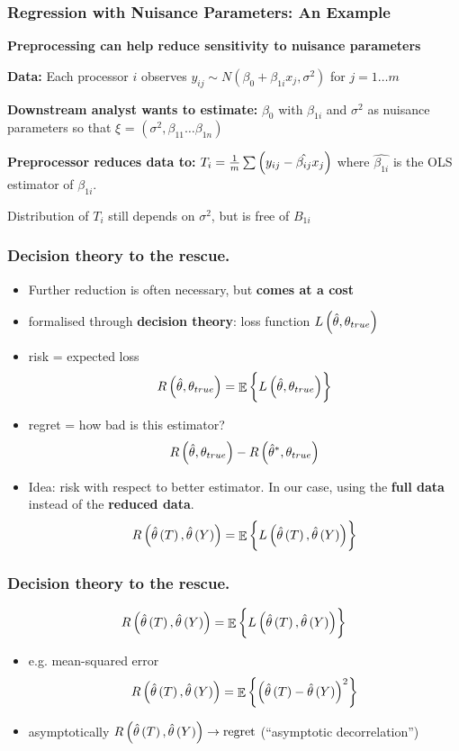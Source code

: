 \documentclass[10pt, compress]{beamer}
\DeclareMathOperator{\E}{\mathbb{E}}
\newcommand{\that}{\hat{\theta}}
\begin{document}
\begin{frame}[fragile]

    \frametitle{Regression with Nuisance Parameters: An Example}
    
    \textbf{Preprocessing can help reduce sensitivity to nuisance parameters}
    
    \vspace*{5mm}
    
    \textbf{Data:} Each processor $i$ observes $y_{ij} \sim N(\beta_0 + \beta_{1i}x_j, \sigma^2)$ for $j = 1 \ldots m$
    
    \textbf{Downstream analyst wants to estimate:} $\beta_0$ with $\beta_{1i}$ and $\sigma^2$ as nuisance parameters so that $\xi$ = $(\sigma^2, \beta_{11} \ldots \beta_{1n})$
    
    \textbf{Preprocessor reduces data to:} $T_i = \frac{1}{m}\sum\del{y_{ij} - \hat{\beta_{ij}}x_j}$ where $\hat{\beta_{1i}}$ is the OLS estimator of $\beta_{1i}$.
    
    \vspace*{5mm}
    
    Distribution of $T_i$ still depends on $\sigma^2$, but is free of $B_{1i}$ 
\end{frame}


\begin{frame}[fragile]
    \frametitle{Decision theory to the rescue.}
	\begin{itemize}
		\item Further reduction is often necessary, but \textbf{comes at a cost}
		\item formalised through \textbf{decision theory}: loss function $L\del{ \hat{\theta}, \theta_{true}}$
		\item risk = expected loss 
			\[ 
				R\del{\hat{\theta},\theta_{true}} = \E{\cbr{L\del{ \hat{\theta}, \theta_{true}}}}
			\]
		\item regret = how bad is this estimator?
			\[
				R\del{\hat{\theta},\theta_{true}} - R\del{\hat{\theta}^*,\theta_{true}}
			\]
		\item Idea: risk with respect to better estimator. In our case, using the \textbf{full data} instead of the \textbf{reduced data}.
				\[
					R\del{\that\del{T},\that\del{Y}} = \E{\cbr{L\del{ \that\del{T},\that\del{Y} }}}
				\]
	\end{itemize}
\end{frame}
\begin{frame}[fragile]
    \frametitle{Decision theory to the rescue.}
		\[
				R\del{\that\del{T},\that\del{Y}} = \E{\cbr{L\del{ \that\del{T},\that\del{Y} }}}
		\]
	\begin{itemize}
		\item e.g. mean-squared error
			\[
			R\del{\that\del{T},\that\del{Y}} = \E{\cbr{ \del{ \that\del{T}-\that\del{Y} }^2 }} 
			\]
		\item asymptotically $R\del{\that\del{T},\that\del{Y}} \rightarrow \mathrm{regret}$ (“asymptotic decorrelation”)
	\end{itemize}
\end{frame}
\end{document}
